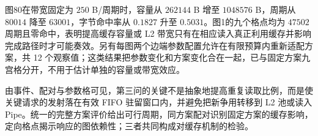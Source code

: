 图80在带宽固定为 $250$ B/周期时，容量从 $262144$ B 增至 $1048576$ B，周期从 $80014$ 降至 $63001$，字节命中率从 $0.1827$ 升至 $0.5031$。图1的九个格点均为 $47502$ 周期且零命中，表明提高缓存容量或 L2 带宽只有在相应读入真正利用缓存并影响完成路径时才可能奏效。另有每图两个边端参数配置允许在有限预算内重新适配方案，共 12 个观察值；这类结果把参数变化和方案变化合在一起，已与固定方案九宫格分开，不用于估计单独的容量或带宽效应。

由事件、配对与参数格可见，第三问的关键不是抽象地提高重复读取比例，而是使关键请求的发射落在有效 FIFO 驻留窗口内，并避免把新争用转移到 L2 池或读入 Pipe。统一的完整方案评价给出可行周期，同方案配对识别固定方案的缓存影响，定向格点揭示响应的图依赖性；三者共同构成对缓存机制的检验。


